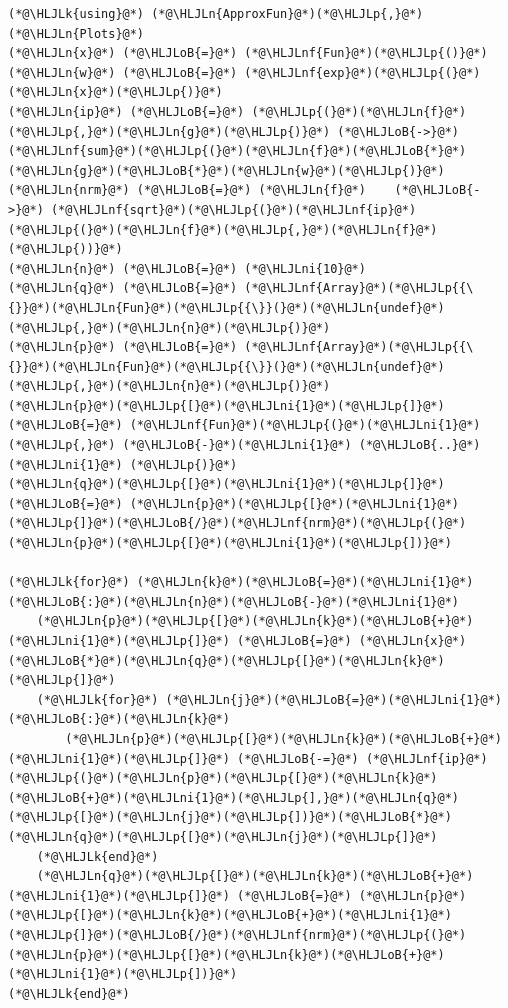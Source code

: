 \documentclass[12pt,a4paper]{article}
\newcommand{\HLJLk}[1]{\textcolor[RGB]{148,91,176}{\textbf{#1}}}
\newcommand{\HLJLn}[1]{#1}
\newcommand{\HLJLnf}[1]{\textcolor[RGB]{66,102,213}{#1}}
\newcommand{\HLJLni}[1]{\textcolor[RGB]{59,151,46}{#1}}
\newcommand{\HLJLoB}[1]{\textcolor[RGB]{102,102,102}{\textbf{#1}}}
\newcommand{\HLJLp}[1]{#1}
\begin{document}
\begin{lstlisting}
(*@\HLJLk{using}@*) (*@\HLJLn{ApproxFun}@*)(*@\HLJLp{,}@*) (*@\HLJLn{Plots}@*)
(*@\HLJLn{x}@*) (*@\HLJLoB{=}@*) (*@\HLJLnf{Fun}@*)(*@\HLJLp{()}@*)
(*@\HLJLn{w}@*) (*@\HLJLoB{=}@*) (*@\HLJLnf{exp}@*)(*@\HLJLp{(}@*)(*@\HLJLn{x}@*)(*@\HLJLp{)}@*)
(*@\HLJLn{ip}@*) (*@\HLJLoB{=}@*) (*@\HLJLp{(}@*)(*@\HLJLn{f}@*)(*@\HLJLp{,}@*)(*@\HLJLn{g}@*)(*@\HLJLp{)}@*) (*@\HLJLoB{->}@*) (*@\HLJLnf{sum}@*)(*@\HLJLp{(}@*)(*@\HLJLn{f}@*)(*@\HLJLoB{*}@*)(*@\HLJLn{g}@*)(*@\HLJLoB{*}@*)(*@\HLJLn{w}@*)(*@\HLJLp{)}@*)
(*@\HLJLn{nrm}@*) (*@\HLJLoB{=}@*) (*@\HLJLn{f}@*)    (*@\HLJLoB{->}@*) (*@\HLJLnf{sqrt}@*)(*@\HLJLp{(}@*)(*@\HLJLnf{ip}@*)(*@\HLJLp{(}@*)(*@\HLJLn{f}@*)(*@\HLJLp{,}@*)(*@\HLJLn{f}@*)(*@\HLJLp{))}@*)
(*@\HLJLn{n}@*) (*@\HLJLoB{=}@*) (*@\HLJLni{10}@*)
(*@\HLJLn{q}@*) (*@\HLJLoB{=}@*) (*@\HLJLnf{Array}@*)(*@\HLJLp{{\{}}@*)(*@\HLJLn{Fun}@*)(*@\HLJLp{{\}}(}@*)(*@\HLJLn{undef}@*)(*@\HLJLp{,}@*)(*@\HLJLn{n}@*)(*@\HLJLp{)}@*)
(*@\HLJLn{p}@*) (*@\HLJLoB{=}@*) (*@\HLJLnf{Array}@*)(*@\HLJLp{{\{}}@*)(*@\HLJLn{Fun}@*)(*@\HLJLp{{\}}(}@*)(*@\HLJLn{undef}@*)(*@\HLJLp{,}@*)(*@\HLJLn{n}@*)(*@\HLJLp{)}@*)
(*@\HLJLn{p}@*)(*@\HLJLp{[}@*)(*@\HLJLni{1}@*)(*@\HLJLp{]}@*) (*@\HLJLoB{=}@*) (*@\HLJLnf{Fun}@*)(*@\HLJLp{(}@*)(*@\HLJLni{1}@*)(*@\HLJLp{,}@*) (*@\HLJLoB{-}@*)(*@\HLJLni{1}@*) (*@\HLJLoB{..}@*) (*@\HLJLni{1}@*) (*@\HLJLp{)}@*)
(*@\HLJLn{q}@*)(*@\HLJLp{[}@*)(*@\HLJLni{1}@*)(*@\HLJLp{]}@*) (*@\HLJLoB{=}@*) (*@\HLJLn{p}@*)(*@\HLJLp{[}@*)(*@\HLJLni{1}@*)(*@\HLJLp{]}@*)(*@\HLJLoB{/}@*)(*@\HLJLnf{nrm}@*)(*@\HLJLp{(}@*)(*@\HLJLn{p}@*)(*@\HLJLp{[}@*)(*@\HLJLni{1}@*)(*@\HLJLp{])}@*)

(*@\HLJLk{for}@*) (*@\HLJLn{k}@*)(*@\HLJLoB{=}@*)(*@\HLJLni{1}@*)(*@\HLJLoB{:}@*)(*@\HLJLn{n}@*)(*@\HLJLoB{-}@*)(*@\HLJLni{1}@*)
    (*@\HLJLn{p}@*)(*@\HLJLp{[}@*)(*@\HLJLn{k}@*)(*@\HLJLoB{+}@*)(*@\HLJLni{1}@*)(*@\HLJLp{]}@*) (*@\HLJLoB{=}@*) (*@\HLJLn{x}@*)(*@\HLJLoB{*}@*)(*@\HLJLn{q}@*)(*@\HLJLp{[}@*)(*@\HLJLn{k}@*)(*@\HLJLp{]}@*) 
    (*@\HLJLk{for}@*) (*@\HLJLn{j}@*)(*@\HLJLoB{=}@*)(*@\HLJLni{1}@*)(*@\HLJLoB{:}@*)(*@\HLJLn{k}@*)
        (*@\HLJLn{p}@*)(*@\HLJLp{[}@*)(*@\HLJLn{k}@*)(*@\HLJLoB{+}@*)(*@\HLJLni{1}@*)(*@\HLJLp{]}@*) (*@\HLJLoB{-=}@*) (*@\HLJLnf{ip}@*)(*@\HLJLp{(}@*)(*@\HLJLn{p}@*)(*@\HLJLp{[}@*)(*@\HLJLn{k}@*)(*@\HLJLoB{+}@*)(*@\HLJLni{1}@*)(*@\HLJLp{],}@*)(*@\HLJLn{q}@*)(*@\HLJLp{[}@*)(*@\HLJLn{j}@*)(*@\HLJLp{])}@*)(*@\HLJLoB{*}@*)(*@\HLJLn{q}@*)(*@\HLJLp{[}@*)(*@\HLJLn{j}@*)(*@\HLJLp{]}@*)
    (*@\HLJLk{end}@*)
    (*@\HLJLn{q}@*)(*@\HLJLp{[}@*)(*@\HLJLn{k}@*)(*@\HLJLoB{+}@*)(*@\HLJLni{1}@*)(*@\HLJLp{]}@*) (*@\HLJLoB{=}@*) (*@\HLJLn{p}@*)(*@\HLJLp{[}@*)(*@\HLJLn{k}@*)(*@\HLJLoB{+}@*)(*@\HLJLni{1}@*)(*@\HLJLp{]}@*)(*@\HLJLoB{/}@*)(*@\HLJLnf{nrm}@*)(*@\HLJLp{(}@*)(*@\HLJLn{p}@*)(*@\HLJLp{[}@*)(*@\HLJLn{k}@*)(*@\HLJLoB{+}@*)(*@\HLJLni{1}@*)(*@\HLJLp{])}@*)
(*@\HLJLk{end}@*)


\end{lstlisting}
\end{document}
